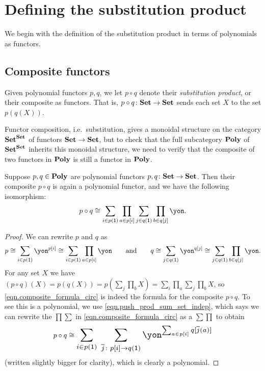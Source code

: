 \documentclass[Book-Poly]{subfiles}
\begin{document}
\section{Defining the substitution product}\label{sec.comon.comp.def}
We begin with the definition of the substitution product in terms of polynomials as functors.

\subsection{Composite functors}\label{subsec.comon.comp.def.functor}

\begin{definition} \label{def.comp}
Given polynomial functors $p, q$, we let $p \circ q$ denote their \emph{substitution product}, or their composite as functors.
That is, $p \circ q \colon \mathbf{Set} \to \mathbf{Set}$ sends each set $X$ to the set $p(q(X))$.
\end{definition}

Functor composition, i.e.\ substitution, gives a monoidal structure on the category $\mathbf{Set}^{\mathbf{Set}}$ of functors $\mathbf{Set}\to\mathbf{Set}$, but to check that the full subcategory $\mathbf{Poly}$ of $\mathbf{Set}^{\mathbf{Set}}$ inherits this monoidal structure, we need to verify that the composite of two functors in $\mathbf{Poly}$ is still a functor in $\mathbf{Poly}$.

\begin{proposition}\label{prop.poly_closed_comp}
Suppose $p,q\in\mathbf{Poly}$ are polynomial functors $p,q\colon\mathbf{Set}\to\mathbf{Set}$. Then their composite $p\circ q$ is again a polynomial functor, and we have the following isomorphism:
\begin{equation} \label{eqn.composite_formula_circ}
p\circ q\iso\sum_{i\in p(\1)}\prod_{a\in p[i]}\sum_{j\in q(\1)}\prod_{b\in q[j]}\yon.
\end{equation}
\end{proposition}
\begin{proof}
We can rewrite $p$ and $q$ as
\[
p\iso\sum_{i\in p(\1)}\yon^{p[i]}\iso\sum_{i\in p(\1)}\prod_{a\in p[i]}\yon
\qqand
q\iso\sum_{j\in q(\1)}\yon^{q[j]}\iso\sum_{j\in q(\1)}\prod_{b\in q[j]}\yon.
\]
For any set $X$ we have $(p\circ q)(X)=p(q(X))=p(\sum_j\prod_b X)=\sum_i\prod_a\sum_j\prod_bX$, so \eqref{eqn.composite_formula_circ} is indeed the formula for the composite $p \circ q$.
To see this is a polynomial, we use \eqref{eqn.push_prod_sum_set_indep}, which says we can rewrite the $\prod\sum$ in \eqref{eqn.composite_formula_circ} as a $\sum\prod$ to obtain
\begin{align}\label{eqn.composite_formula_sums_first_circ}
  p\circ q\iso
  \scalebox{1.3}{$\displaystyle
  \sum_{i\in p(\1)} \; \sum_{\ol{j}\colon p[i]\to q(\1)}\yon^{\sum_{a\in p[i]}q[\ol{j}(a)]}$}
\end{align}
(written slightly bigger for clarity), which is clearly a polynomial.
\end{proof}
\end{document}
